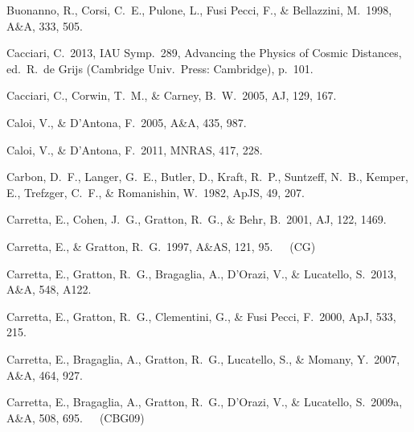 \documentclass[12pt,preprint]{aastex}
\begin{document}
\begin{thebibliography}{}
Buonanno, R., Corsi, C.~E., Pulone, L., Fusi Pecci, F., \& Bellazzini, M.~1998,
  A\&A, 333, 505.

Cacciari, C.~2013, IAU Symp.~289, Advancing the Physics of Cosmic Distances,
 ed.~R.~de Grijs (Cambridge Univ.~Press: Cambridge), p.~101.


Cacciari, C., Corwin, T.~M., \& Carney, B.~W.~2005, AJ, 129, 167.

Caloi, V., \& D'Antona, F.~2005, A\&A, 435, 987.

Caloi, V., \& D'Antona, F.~2011, MNRAS, 417, 228.


Carbon, D.~F., Langer, G.~E., Butler, D., Kraft, R.~P., Suntzeff, N.~B.,
 Kemper, E., Trefzger, C.~F., \& Romanishin, W.~1982, ApJS, 49, 207.

Carretta, E., Cohen, J.~G., Gratton, R.~G., \& Behr, B.~2001, AJ, 122, 1469.

Carretta, E., \& Gratton, R.~G.~1997, A\&AS, 121, 95.\ \ \ (CG)


Carretta, E., Gratton, R.~G., Bragaglia, A., D'Orazi, V., \& Lucatello,
 S.~2013, A\&A, 548, A122.

Carretta, E., Gratton, R.~G., Clementini, G., \& Fusi Pecci, F.~2000, ApJ,
 533, 215.

Carretta, E., Bragaglia, A., Gratton, R.~G., Lucatello, S., \& Momany,
 Y.~2007, A\&A, 464, 927.

Carretta, E., Bragaglia, A., Gratton, R.~G., D'Orazi, V., \& Lucatello,
 S.~2009a, A\&A, 508, 695.\ \ \ (CBG09)


\end{thebibliography}
\end{document}
